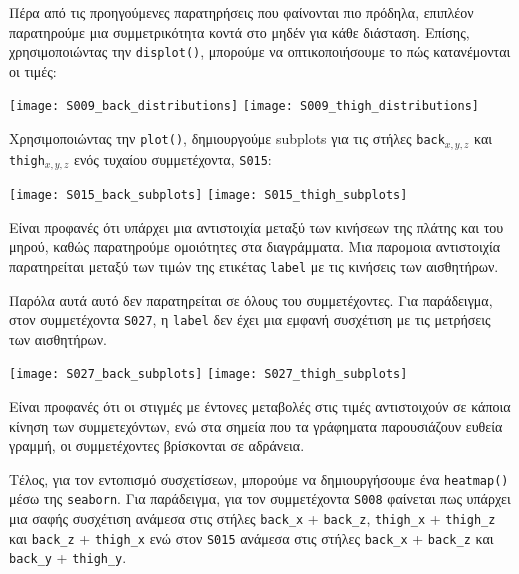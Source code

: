        Πέρα από τις προηγούμενες παρατηρήσεις που φαίνονται πιο πρόδηλα, επιπλέον παρατηρούμε μια συμμετρικότητα κοντά στο μηδέν
        για κάθε διάσταση. Επίσης, χρησιμοποιώντας την \texttt{displot()}, μπορούμε να οπτικοποιήσουμε το πώς κατανέμονται οι τιμές:

        \begin{multicols}{2} \centering
            \texttt{[image: S009\_back\_distributions]}
            \texttt{[image: S009\_thigh\_distributions]}
        \end{multicols}

        Χρησιμοποιώντας την \texttt{plot()}, δημιουργούμε subplots για τις στήλες \texttt{back}\(_{x,y,z}\)
        και \texttt{thigh}\(_{x,y,z}\) ενός τυχαίου συμμετέχοντα, \texttt{S015}:

        \begin{multicols}{2} \centering
            \noindent\texttt{[image: S015\_back\_subplots]}
            \texttt{[image: S015\_thigh\_subplots]}
        \end{multicols}

        Είναι προφανές ότι υπάρχει μια αντιστοιχία μεταξύ των κινήσεων της πλάτης και του μηρού, καθώς παρατηρούμε ομοιότητες στα διαγράμματα.
        Μια παρομοια αντιστοιχία παρατηρείται μεταξύ των τιμών της ετικέτας \texttt{label} με τις κινήσεις των αισθητήρων.

        Παρόλα αυτά αυτό δεν παρατηρείται σε όλους του συμμετέχοντες. Για παράδειγμα, στον συμμετέχοντα \texttt{S027},
        η \texttt{label} δεν έχει μια εμφανή συσχέτιση με τις μετρήσεις των αισθητήρων.

        \begin{multicols}{2} \centering
            \noindent\texttt{[image: S027\_back\_subplots]}
            \texttt{[image: S027\_thigh\_subplots]}
        \end{multicols}

        Είναι προφανές ότι οι στιγμές με έντονες μεταβολές στις τιμές αντιστοιχούν σε κάποια κίνηση των συμμετεχόντων,
        ενώ στα σημεία που τα γράφηματα παρουσιάζουν ευθεία γραμμή, οι συμμετέχοντες βρίσκονται σε αδράνεια.

        Τέλος, για τον εντοπισμό συσχετίσεων, μπορούμε να δημιουργήσουμε ένα \texttt{heatmap()} μέσω της \texttt{seaborn}.
        Για παράδειγμα, για τον συμμετέχοντα \texttt{S008} φαίνεται πως υπάρχει μια σαφής συσχέτιση ανάμεσα στις στήλες \verb|back_x| + \verb|back_z|,
        \verb|thigh_x| + \verb|thigh_z| και \verb|back_z| + \verb|thigh_x| ενώ στον \texttt{S015} ανάμεσα στις στήλες \verb|back_x| + \verb|back_z| και \verb|back_y| + \verb|thigh_y|.

